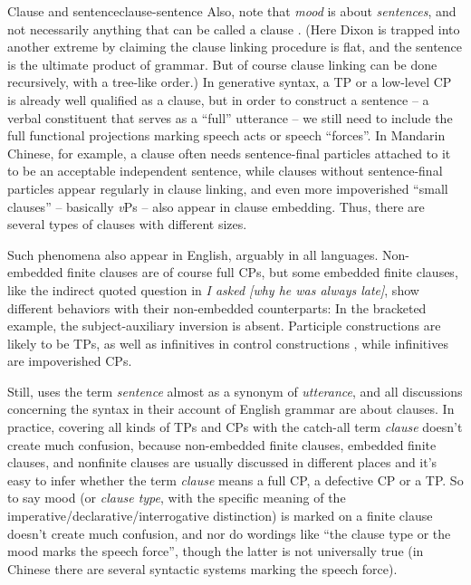 \documentclass[UTF8, a4paper, oneside, scheme=plain]{ctexrep}
\newcommand*{\citepage}[1]{p.~{#1}}
\newcommand*{\term}[1]{\emph{#1}}
\newcommand{\corpus}[1]{\emph{#1}}
\newcommand{\vP}{\textit{v}P}
\begin{document}
\begin{theorybox}{Clause and sentence}{clause-sentence}
    Also, note that \emph{mood} is about \emph{sentences}, 
    and not necessarily anything that can be called a clause \citet[96]{dixon2009basic1}.
    (Here Dixon is trapped into another extreme by claiming 
    the clause linking procedure is flat,
    and the sentence is the ultimate product of grammar.
    But of course clause linking can be done recursively,
    with a tree-like order.)
    In generative syntax, 
    a TP or a low-level CP is already well qualified as a clause,
    but in order to construct a sentence -- a verbal constituent 
    that serves as a ``full'' utterance --
    we still need to include the full functional projections marking speech acts or speech ``forces''.
    In Mandarin Chinese, for example,
    a clause often needs sentence-final particles attached to it to be an acceptable independent sentence,
    while clauses without sentence-final particles appear regularly in 
    clause linking,
    and even more impoverished ``small clauses'' -- basically \vP{}s -- also appear in clause embedding.
    Thus, there are several types of clauses with different sizes.

    Such phenomena also appear in English, arguably in all languages.
    Non-embedded finite clauses are of course full CPs,
    but some embedded finite clauses,
    like the indirect quoted question in \corpus{I asked [why he was always late]},
    show different behaviors with their non-embedded counterparts:
    In the bracketed example, the subject-auxiliary inversion is absent.
    Participle constructions are likely to be TPs, as well as infinitives in control constructions
    \citep{pires2006minimalist},
    while infinitives are impoverished CPs.

    Still, \citet[\citepage{45}, \citepage{853}]{cgel} uses the term \term{sentence} 
    almost as a synonym of \term{utterance},
    and all discussions concerning the syntax in their account of English grammar are about clauses.
    In practice, covering all kinds of TPs and CPs with the catch-all term \term{clause}
    doesn't create much confusion,
    because non-embedded finite clauses, 
    embedded finite clauses, and nonfinite clauses are usually discussed in different places 
    and it's easy to infer whether the term \term{clause} 
    means a full CP, a defective CP or a TP. 
    So to say mood (or \term{clause type}, 
    with the specific meaning of the imperative/declarative/interrogative distinction)
    is marked on a finite clause doesn't create much confusion, 
    and nor do wordings like ``the clause type or the mood marks the speech force'',
    though the latter is not universally true
    (in Chinese there are several syntactic systems marking the speech force).
\end{theorybox}
\end{document}
